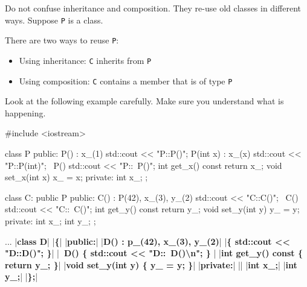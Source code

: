 \newpage{}

Do not confuse inheritance and composition. They re-use old classes in
different ways. Suppose \verb!P! is a class.

There are two ways to reuse \verb!P!:

\begin{itemize}
\item
  Using inheritance: \verb!C! inherits from \verb!P!
\item
  Using composition: \verb!C! contains a member that is of type \verb!P!
\end{itemize}

Look at the following example carefully. Make sure you understand what
is happening.
\begin{console}
#include <iostream>

class P
{
public:
        P() : x_(1) { std::cout << "P::P()\n"; }
        P(int x) : x_(x) { std::cout << "P::P(int)\n"; }
        ~P() { std::cout << "P::~P()\n"; }
        int get_x() const { return x_; }
        void set_x(int x) { x_ = x; }
private:
        int x_;
};

class C: public P
{
public:
        C() : P(42), x_(3), y_(2)
        { std::cout << "C::C()"; }
        ~C() { std::cout << "C::~C()\n"; }
        int get_y() const { return y_; }
        void set_y(int y) { y_ = y; }
private:
        int x_;
        int y_;
};
\end{console}

\newpage\begin{consolethree}[escapeinside=||]
...
|\textbf{class D}|
|\textbf{\{}|
|\textbf{public:}|
        |\textbf{D() : p\_(42), x\_(3), y\_(2)}|
        |\textbf{\{ std::cout << "D::D()"; \}}|
        |\textbf{~D() \{ std::cout << "D::~D()\textbackslash n"; \}} |
        |\textbf{int get\_y() const \{ return y\_; \}}|
        |\textbf{void set\_y(int y) \{ y\_ = y; \}}|
|\textbf{private:}|
        || 
        |\textbf{int x\_;}|
        |\textbf{int y\_;}|
|\textbf{\};}|
\end{consolethree}

